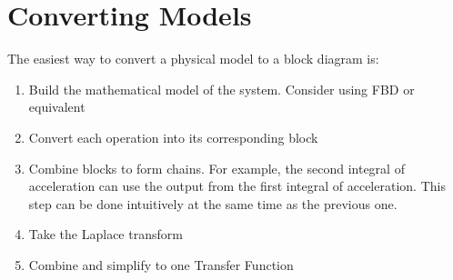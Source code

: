 \documentclass{../templates/topic}
\begin{document}
\section{Converting Models}

The easiest way to convert a physical model to a block diagram is:
\begin{enumerate}
	\item Build the mathematical model of the system. Consider using FBD or equivalent
	\item Convert each operation into its corresponding block
	\item Combine blocks to form chains. For example, the second integral of acceleration can use the output from the first integral of acceleration. This step can be done intuitively at the same time as the previous one.
	\item Take the Laplace transform
	\item Combine and simplify to one Transfer Function
\end{enumerate}
\end{document}
